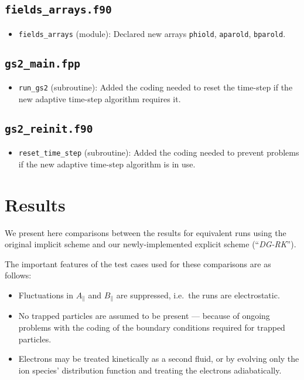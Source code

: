 \documentclass[10pt,a4paper]{article}
\begin{document}
\subsection{\texttt{fields\_arrays.f90}}

\begin{itemize}

\item \texttt{fields\_arrays} (module): Declared new arrays \texttt{phiold},
  \texttt{aparold}, \texttt{bparold}.

\end{itemize}

\subsection{\texttt{gs2\_main.fpp}}

\begin{itemize}

\item \texttt{run\_gs2} (subroutine): Added the coding needed to reset the
  time-step if the new adaptive time-step algorithm requires it.

\end{itemize}

\subsection{\texttt{gs2\_reinit.f90}}

\begin{itemize}

\item \texttt{reset\_time\_step} (subroutine): Added the coding needed to
  prevent problems if the new adaptive time-step algorithm is in use.

\end{itemize}

\section{Results}

We present here comparisons between the results for equivalent runs using the
original implicit scheme and our newly-implemented explicit scheme (``\textit{DG-RK}'').

The important features of the test cases used for these comparisons are as
follows:

\begin{itemize}

\item Fluctuations in $A_\parallel$ and $B_\parallel$ are suppressed, i.e.\
  the runs are electrostatic.

\item No trapped particles are assumed to be present --- because of ongoing
  problems with the coding of the boundary conditions required for trapped
  particles.

\item Electrons may be treated kinetically as a second fluid, or by evolving
  only the ion species' distribution function and treating the electrons
  adiabatically.

\end{itemize}
\end{document}
